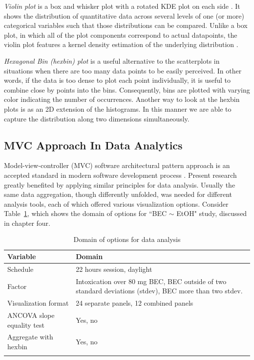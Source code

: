 	\textit{Violin plot} is a box and whisker plot with a rotated KDE plot on each side . It shows the distribution of quantitative data across several levels of one (or more) categorical variables such that those distributions can be compared. Unlike a box plot, in which all of the plot components correspond to actual datapoints, the violin plot features a kernel density estimation of the underlying distribution .
	
	\textit{Hexagonal Bin (hexbin) plot} is a useful alternative to the scatterplots in situations when there are too many data points to be easily perceived. In other words, if the data is too dense to plot each point individually, it is useful to combine close by points into the bins. Consequently, bins are plotted with varying color indicating the number of occurrences.  
	Another way to look at the hexbin plots is as an 2D extension of the histograms. In this manner we are able to capture the distribution along two dimensions simultaneously. 
	
	\subsection{MVC Approach In Data Analytics}
	Model-view-controller (MVC) software architectural pattern  approach is an accepted standard in modern software development process . Present research greatly benefited by applying similar principles for data analysis. Usually the same data aggregation, though differently unfolded, was needed for different analysis tools, each of which offered various visualization options. Consider Table~\ref{tab:bec-domain-options}, which shows the domain of options for ``BEC $\sim$ EtOH" study, discussed in chapter four.
	
	\begin{table}[h]
	\centering
	\caption{Domain of options for data analysis}
	\label{tab:bec-domain-options}
	\begin{tabular}{lp{3in}}
	    \hline
	    \abovespace\belowspace
	    Variable & Domain \\
	    \hline
	    Schedule & 22 hours session, daylight   \\
	    Factor & Intoxication over 80 mg BEC, BEC outside of two standard deviations (stdev), BEC more than two stdev.   \\
	    Visualization format & 24 separate panels, 12 combined panels   \\
	    ANCOVA slope equality test & Yes, no   \\
	    Aggregate with hexbin & Yes, no  \\
	    \belowspace \\
	    \hline
	\end{tabular}
	\end{table}
	
